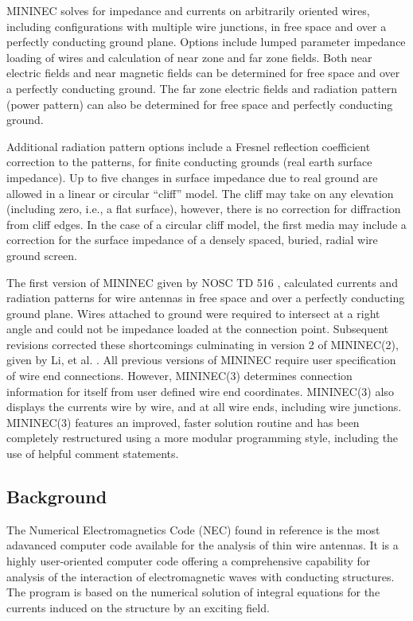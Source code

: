 \documentclass[12pt]{article}
\begin{document}
MININEC solves for impedance and currents on arbitrarily oriented wires,
including configurations with multiple wire junctions, in free space
and over a perfectly conducting ground plane. Options include lumped
parameter impedance loading of wires and calculation of near zone and
far zone fields. Both near electric fields and near magnetic fields can
be determined for free space and over a perfectly conducting ground. The
far zone electric fields and radiation pattern (power pattern) can also
be determined for free space and perfectly conducting ground.

Additional radiation pattern options include a Fresnel reflection
coefficient correction to the patterns, for finite conducting grounds
(real earth surface impedance). Up to five changes in surface impedance
due to real ground are allowed in a linear or circular ``cliff'' model.
The cliff may take on any elevation (including zero, i.e., a flat
surface), however, there is no correction for diffraction from cliff
edges. In the case of a circular cliff model, the first media may
include a correction for the surface impedance of a densely spaced,
buried, radial wire ground screen.

The first version of MININEC given by NOSC TD 516 \cite{r1}, calculated
currents and radiation patterns for wire antennas in free space and over
a perfectly conducting ground plane. Wires attached to ground were
required to intersect at a right angle and could not be impedance loaded
at the connection point. Subsequent revisions corrected these
shortcomings culminating in version 2 of MININEC(2), given by Li, et al.
\cite{r3}. All previous versions of MININEC require user specification
of wire end connections. However, MININEC(3) determines connection
information for itself from user defined wire end coordinates.
MININEC(3) also displays the currents wire by wire, and at all wire
ends, including wire junctions. MININEC(3) features an improved, faster
solution routine and has been completely restructured using a more
modular programming style, including the use of helpful comment
statements.

\subsection{Background}
The Numerical Electromagnetics Code (NEC) found in reference \cite{r4}
is the most adavanced computer code available for the analysis of thin
wire antennas. It is a highly user-oriented computer code offering a
comprehensive capability for analysis of the interaction of
electromagnetic waves with conducting structures. The program is based
on the numerical solution of integral equations for the currents induced
on the structure by an exciting field.
\end{document}
